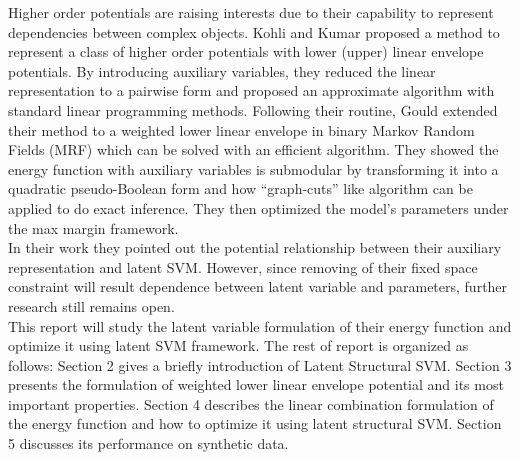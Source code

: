 \documentclass{article}
\begin{document}
	Higher order potentials are raising interests due to their capability to represent dependencies between complex objects. Kohli and Kumar\cite{kohli2009robust} proposed a method to represent a class of higher order potentials with lower (upper) linear envelope potentials. By introducing auxiliary variables, they reduced the linear representation to a pairwise form and proposed an approximate algorithm with standard linear programming methods. Following their routine, Gould\cite{gouldlearning} extended their method to a weighted lower linear envelope in binary Markov Random Fields (MRF) which can be solved with an efficient algorithm. They showed the energy function with auxiliary variables is submodular by transforming it into a quadratic pseudo-Boolean form and how “graph-cuts” like algorithm can be applied to do exact inference. They then optimized the model’s parameters under the max margin framework\cite{tsochantaridis2005large}. \\
	In their work they pointed out the potential relationship between their auxiliary representation and latent SVM\cite{yu2009learning}. However, since removing of their fixed space constraint will result dependence between latent variable and parameters, further research still remains open.\\
	This report will study the latent variable formulation of their energy function and optimize it using latent SVM framework. The rest of report is organized as follows: Section 2 gives a briefly introduction of Latent Structural SVM. Section 3 presents the formulation of weighted lower linear envelope potential and its most important properties. Section 4 describes the linear combination formulation of the energy function and how to optimize it using latent structural SVM. Section 5 discusses its performance on synthetic data.
	
\end{document}
